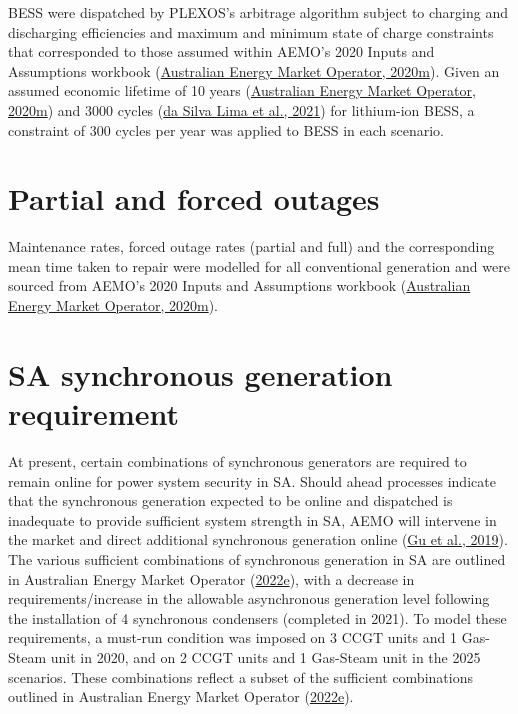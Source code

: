 \documentclass[12pt,a4paper,]{report}
\begin{document}
BESS were dispatched by PLEXOS's arbitrage algorithm subject to charging
and discharging efficiencies and maximum and minimum state of charge
constraints that corresponded to those assumed within AEMO's 2020 Inputs
and Assumptions workbook
(\protect\hyperlink{ref-australianenergymarketoperator2020InputsAssumptions2020}{Australian
Energy Market Operator, 2020m}). Given an assumed economic lifetime of
10 years
(\protect\hyperlink{ref-australianenergymarketoperator2020InputsAssumptions2020}{Australian
Energy Market Operator, 2020m}) and 3000 cycles
(\protect\hyperlink{ref-dasilvalimaLifeCycleAssessment2021}{da Silva
Lima et al., 2021}) for lithium-ion BESS, a constraint of 300 cycles per
year was applied to BESS in each scenario.

\hypertarget{partial-and-forced-outages}{%
\section{Partial and forced outages}\label{partial-and-forced-outages}}

Maintenance rates, forced outage rates (partial and full) and the
corresponding mean time taken to repair were modelled for all
conventional generation and were sourced from AEMO's 2020 Inputs and
Assumptions workbook
(\protect\hyperlink{ref-australianenergymarketoperator2020InputsAssumptions2020}{Australian
Energy Market Operator, 2020m}).

\hypertarget{sa-synchronous-generation-requirement}{%
\section{SA synchronous generation
requirement}\label{sa-synchronous-generation-requirement}}

At present, certain combinations of synchronous generators are required
to remain online for power system security in SA. Should ahead processes
indicate that the synchronous generation expected to be online and
dispatched is inadequate to provide sufficient system strength in SA,
AEMO will intervene in the market and direct additional synchronous
generation online (\protect\hyperlink{ref-guReviewSystemStrength2019}{Gu
et al., 2019}). The various sufficient combinations of synchronous
generation in SA are outlined in Australian Energy Market Operator
(\protect\hyperlink{ref-australianenergymarketoperatorTransferLimitAdvice2022}{2022e}),
with a decrease in requirements/increase in the allowable asynchronous
generation level following the installation of 4 synchronous condensers
(completed in 2021). To model these requirements, a must-run condition
was imposed on 3 CCGT units and 1 Gas-Steam unit in 2020, and on 2 CCGT
units and 1 Gas-Steam unit in the 2025 scenarios. These combinations
reflect a subset of the sufficient combinations outlined in Australian
Energy Market Operator
(\protect\hyperlink{ref-australianenergymarketoperatorTransferLimitAdvice2022}{2022e}).
\end{document}
